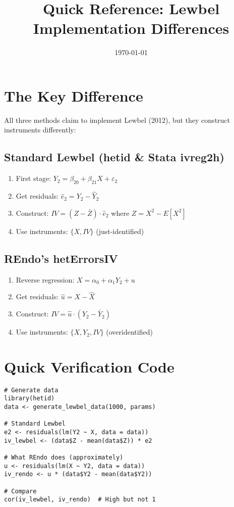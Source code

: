 \documentclass[11pt]{article}
\title{Quick Reference: Lewbel Implementation Differences}
\date{\today}
\begin{document}
\maketitle

\section*{The Key Difference}

All three methods claim to implement Lewbel (2012), but they construct instruments differently:

\subsection*{Standard Lewbel (hetid \& Stata ivreg2h)}
\begin{enumerate}
\item First stage: $Y_2 = \beta_{20} + \beta_{21}X + \varepsilon_2$
\item Get residuals: $\hat{e}_2 = Y_2 - \hat{Y}_2$
\item Construct: $IV = (Z - \bar{Z}) \cdot \hat{e}_2$ where $Z = X^2 - E[X^2]$
\item Use instruments: $\{X, IV\}$ (just-identified)
\end{enumerate}

\subsection*{REndo's hetErrorsIV}
\begin{enumerate}
\item Reverse regression: $X = \alpha_0 + \alpha_1 Y_2 + u$
\item Get residuals: $\hat{u} = X - \hat{X}$
\item Construct: $IV = \hat{u} \cdot (Y_2 - \bar{Y}_2)$
\item Use instruments: $\{X, Y_2, IV\}$ (overidentified)
\end{enumerate}

\section*{Quick Verification Code}

\begin{verbatim}
# Generate data
library(hetid)
data <- generate_lewbel_data(1000, params)

# Standard Lewbel
e2 <- residuals(lm(Y2 ~ X, data = data))
iv_lewbel <- (data$Z - mean(data$Z)) * e2

# What REndo does (approximately)
u <- residuals(lm(X ~ Y2, data = data))
iv_rendo <- u * (data$Y2 - mean(data$Y2))

# Compare
cor(iv_lewbel, iv_rendo)  # High but not 1
\end{verbatim}
\end{document}
